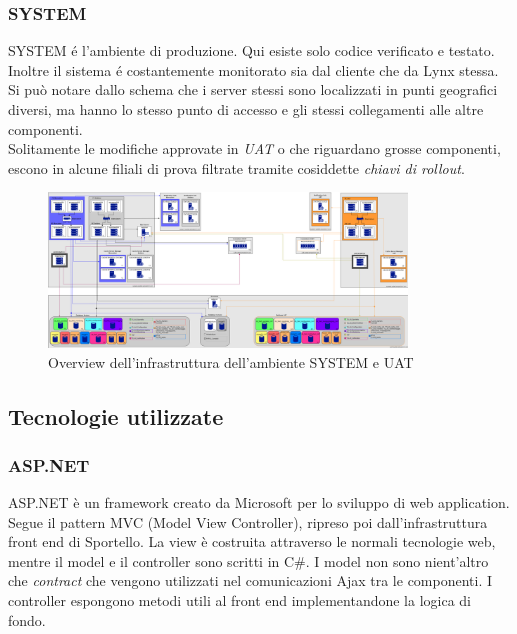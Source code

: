 \subsubsection{SYSTEM}

SYSTEM é l'ambiente di produzione. Qui esiste solo codice verificato e testato. Inoltre il sistema é costantemente monitorato sia dal cliente che da Lynx stessa.  \\
Si può notare dallo schema che i server stessi sono localizzati in punti geografici diversi, ma hanno lo stesso punto di accesso e gli stessi collegamenti alle altre componenti. \\
Solitamente le modifiche approvate in \textit{UAT} o che riguardano grosse componenti, escono in alcune filiali di prova filtrate tramite cosiddette \textit{chiavi di rollout}.  

\begin{figure}[!ht]
    \centering
	\includegraphics[width=0.85\textwidth]{./res/img/SchemiAmbienti_SYSTEM-UAT_v1.1.png}
    \caption{Overview dell'infrastruttura dell'ambiente SYSTEM e UAT}
\end{figure}

\subsection{Tecnologie utilizzate}

\subsubsection{ASP.NET}
ASP.NET è un framework creato da Microsoft per lo sviluppo di web application. Segue il pattern MVC (Model View Controller), ripreso poi dall'infrastruttura front end di Sportello. La view è costruita attraverso le normali tecnologie web, mentre il model e il controller sono scritti in C\#. I model non sono nient'altro che \textit{contract} che vengono utilizzati nel comunicazioni Ajax tra le componenti. I controller espongono metodi utili al front end implementandone la logica di fondo.  

